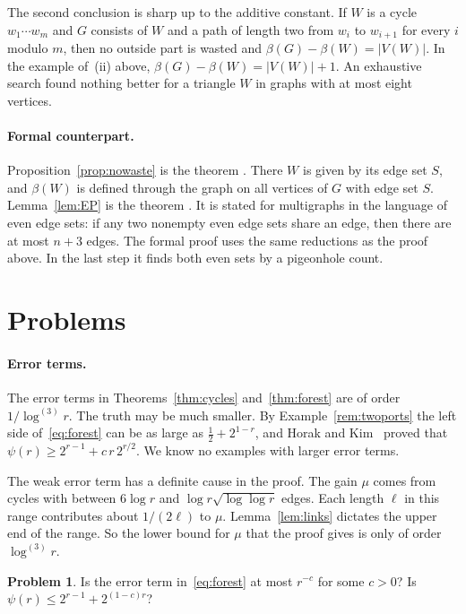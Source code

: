 \documentclass[11pt]{article}
\theoremstyle{definition}
\newtheorem{problem}[theorem]{Problem}
\theoremstyle{remark}
\newcommand{\lgk}[1]{\log^{(#1)}}
\newcommand{\half}{\tfrac12}
\numberwithin{equation}{section}
\begin{document}
The second conclusion is sharp up to the additive constant. If $W$ is a cycle $w_1\cdots w_m$ and
$G$ consists of $W$ and a path of length two from $w_i$ to $w_{i+1}$ for every $i$ modulo $m$, then
no outside part is wasted and $\beta(G)-\beta(W)=|V(W)|$. In the example of~(ii) above,
$\beta(G)-\beta(W)=|V(W)|+1$. An exhaustive search found nothing better for a triangle $W$ in
graphs with at most eight vertices.

\paragraph{Formal counterpart.}
Proposition~\ref{prop:nowaste} is the theorem . There $W$ is given by its edge
set $S$, and $\beta(W)$ is defined through the graph on all vertices of $G$ with edge set $S$.
Lemma~\ref{lem:EP} is the theorem . It is stated
for multigraphs in the language of even edge sets: if any two nonempty even edge sets share an
edge, then there are at most $n+3$ edges. The formal proof uses the same reductions as the proof
above. In the last step it finds both even sets by a pigeonhole count.
\section{Problems}\label{sec:problems}

\paragraph{Error terms.}
The error terms in Theorems~\ref{thm:cycles} and~\ref{thm:forest} are of order $1/\lgk3r$. The
truth may be much smaller. By Example~\ref{rem:twoports} the left side of~\eqref{eq:forest} can be
as large as $\half+2^{1-r}$, and Horak and Kim~\cite{HK} proved that
$\psi(r)\ge2^{r-1}+c\,r\,2^{r/2}$. We know no examples with larger error terms.

The weak error term has a definite cause in the proof. The gain $\mu$ comes from cycles with between
$6\log r$ and $\log r\sqrt{\log\log r}$ edges. Each length $\ell$ in this range contributes about
$1/(2\ell)$ to $\mu$. Lemma~\ref{lem:links} dictates the upper end of the range. So the lower bound for $\mu$
that the proof gives is only of order $\lgk3r$.

\begin{problem}
Is the error term in~\eqref{eq:forest} at most $r^{-c}$ for some $c>0$? Is
$\psi(r)\le2^{r-1}+2^{(1-c)r}$?
\end{problem}
\end{document}
